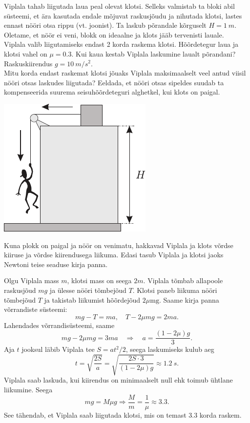 
Viplala tahab liigutada laua peal olevat klotsi. Selleks valmistab ta bloki abil süsteemi, et ära kasutada endale mõjuvat raskusjõudu ja nihutada klotsi, lastes ennast nööri otsa rippu (vt. joonist). Ta laskub põrandale kõrguselt $H=\SI{1}{m} .$ Oletame, et nöör ei veni, blokk on ideaalne ja klots jääb tervenisti lauale.\\
\osa Viplala valib liigutamiseks endast 2 korda raskema klotsi. Hõõrdetegur laua ja klotsi vahel on $\mu=\num{0,3}$. Kui kaua kestab Viplala laskumine laualt põrandani? Raskuskiirendus $g=\SI{10}{m/s^2}$.\\
\osa Mitu korda endast raskemat klotsi jõuaks Viplala maksimaalselt veel antud viisil nööri otsas laskudes liigutada? Eeldada, et nööri otsas sipeldes suudab ta kompenseerida suurema seisuhõõrdeteguri alghetkel, kui klots on paigal.
\begin{center}
	\includegraphics[width=0.4\linewidth]{2004-lahg-01-yl.pdf}
\end{center}

\hint
Kuna plokk on paigal ja nöör on venimatu, hakkavad Viplala ja klots võrdse kiiruse ja võrdse kiirendusega liikuma. Edasi tasub Viplala ja klotsi jaoks Newtoni teise seaduse kirja panna.

\solu
Olgu Viplala mass $m$, klotsi mass on seega $2 m$. Viplala tõmbab allapoole raskusjõud $m g$ ja ülesse nööri tõmbejõud $T$. Klotsi paneb liikuma nööri tõmbejõud $T$ ja takistab liikumist hõõrdejõud $2 \mu \mathrm{mg} .$ Saame kirja panna võrrandiste süsteemi:
$$
m g-T=m a, \quad T-2 \mu m g=2 m a.
$$
Lahendades võrrandisüsteemi, saame
$$
m g-2 \mu m g=3 m a \quad \Rightarrow \quad a=\frac{(1-2 \mu) g}{3}.
$$
Aja $t$ jooksul läbib Viplala tee $S=a t^{2} / 2$, seega laskumiseks kulub aeg
$$
t=\sqrt{\frac{2 S}{a}}=\sqrt{\frac{2 S \cdot 3}{(1-2 \mu) g}} \approx \SI{1,2}{s}.
$$
Viplala saab laskuda, kui kiirendus on minimaalselt null ehk toimub ühtlane liikumine. Seega
$$
m g=M \mu g \Rightarrow \frac{M}{m}=\frac{1}{\mu} \approx \num{3,3}.
$$
See tähendab, et Viplala saab liigutada klotsi, mis on temast \num{3,3} korda raskem.
\probend